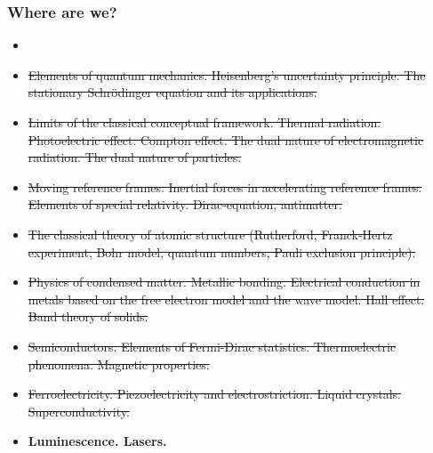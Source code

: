 \documentclass[t,aspectratio=169,xcolor=dvipsnames]{beamer}
\begin{document}
\begin{frame}
\frametitle{Where are we?}
\begin{itemize}
\setlength{\parskip}{0pt}
\setlength{\itemsep}{0pt}
\item {}
  \item \sout{Elements of quantum mechanics. Heisenberg's uncertainty principle. The stationary Schrödinger equation and its applications.}
\item \sout{Limits of the classical conceptual framework. Thermal radiation. Photoelectric effect. Compton effect. The dual nature of electromagnetic radiation. The dual nature of particles.}
\item \sout{Moving reference frames. Inertial forces in accelerating reference frames. Elements of special relativity. Dirac-equation, antimatter.}
\item \sout{The classical theory of atomic structure (Rutherford, Franck-Hertz experiment, Bohr model, quantum numbers, Pauli exclusion principle).}
\item \sout{Physics of condensed matter. Metallic bonding. Electrical conduction in metals based on the free electron model and the wave model. Hall effect. Band theory of solids.}
\pagebreak
\item \sout{Semiconductors. Elements of Fermi-Dirac statistics. Thermoelectric phenomena. Magnetic properties.}
\item \sout{Ferroelectricity. Piezoelectricity and electrostriction. Liquid crystals. Superconductivity.}
\item \textbf{Luminescence. Lasers.} 
\end{itemize}
\end{frame}

\end{document}
